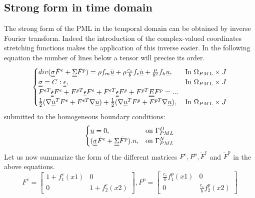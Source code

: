 \subsection{Strong form in time domain}
\par The strong form of the PML in the temporal domain can be obtained by inverse Fourier transform. Indeed the introduction of the complex-valued coordinates stretching functions makes the application of this inverse easier. In the following equation the number of lines below a tensor will precise its order. 
\begin{equation}
\begin{cases}
div(\underline{\underline{\sigma}}\tilde{F}^e + \underline{\underline{\Sigma}}\tilde{F}^p) = \rho f_m \underline{\ddot{u}} + \rho \frac{c_s}{b} f_c \underline{\dot{u}} + \frac{\mu}{b^2}f_k \underline{u}, & \text{In } \Omega_{PML} \times J\\
\underline{\underline{\sigma}} =  C : \underline{\underline{\epsilon}} , & \text{In } \Omega_{PML} \times J\\
F^{eT} \underline{\underline{\dot{\epsilon}}}F^e + F^{pT}\underline{\epsilon}F^e + F^{eT}\underline{\underline{\epsilon}}F^p + F^{pT} \underline{\underline{E}} F^p = ...\\
\frac{1}{2}(\nabla \underline{\dot{u}}^T F^e + F^{eT} \nabla \underline{\dot{u}})+\frac{1}{2}(\nabla \underline{u}^T F^p + F^{pT} \nabla \underline{u}), & \text{In } \Omega_{PML} \times J\\
\end{cases}
\label{eq:2D-PML-strong-timeD}
\end{equation}
submitted to the homogeneous boundary conditions:
\begin{equation}
\begin{cases}
\underline{u}=0,& \text{on } \Gamma_{PML}^D\\
(\underline{\underline{\sigma}}\tilde{F}^e + \underline{\underline{\Sigma}}\tilde{F}^p).n , & \text{on } \Gamma_{PML}^N 
\end{cases}
\label{eq:conditions-lim}
\end{equation}
Let us now summarize the form of the different matrices $F^e,F^p,\tilde{F}^e$ and $\tilde{F}^p$ in the above equations.
\begin{equation}
F^e = \begin{bmatrix}
1+f^e_1(x1)&0\\0&1+f^e_2(x2)
\end{bmatrix}, F^p = \begin{bmatrix}
\frac{c_s}{b}f^p_1(x1)&0\\0&\frac{c_s}{b}f^p_2(x2) 
\end{bmatrix} 
\end{equation}
